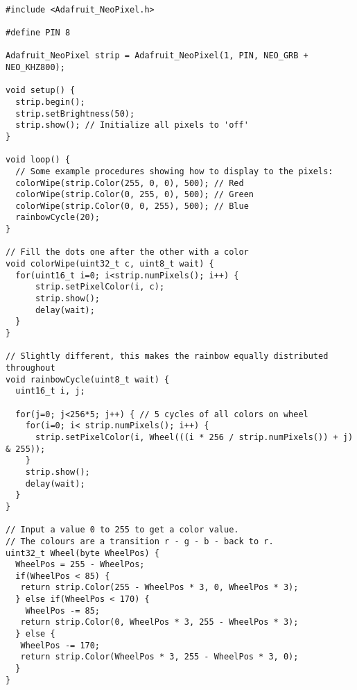 \begin{verbatim}

#include <Adafruit_NeoPixel.h>

#define PIN 8

Adafruit_NeoPixel strip = Adafruit_NeoPixel(1, PIN, NEO_GRB + NEO_KHZ800);

void setup() {
  strip.begin();
  strip.setBrightness(50);
  strip.show(); // Initialize all pixels to 'off'
}

void loop() {
  // Some example procedures showing how to display to the pixels:
  colorWipe(strip.Color(255, 0, 0), 500); // Red
  colorWipe(strip.Color(0, 255, 0), 500); // Green
  colorWipe(strip.Color(0, 0, 255), 500); // Blue
  rainbowCycle(20);
}

// Fill the dots one after the other with a color
void colorWipe(uint32_t c, uint8_t wait) {
  for(uint16_t i=0; i<strip.numPixels(); i++) {
      strip.setPixelColor(i, c);
      strip.show();
      delay(wait);
  }
}

// Slightly different, this makes the rainbow equally distributed throughout
void rainbowCycle(uint8_t wait) {
  uint16_t i, j;

  for(j=0; j<256*5; j++) { // 5 cycles of all colors on wheel
    for(i=0; i< strip.numPixels(); i++) {
      strip.setPixelColor(i, Wheel(((i * 256 / strip.numPixels()) + j) & 255));
    }
    strip.show();
    delay(wait);
  }
}

// Input a value 0 to 255 to get a color value.
// The colours are a transition r - g - b - back to r.
uint32_t Wheel(byte WheelPos) {
  WheelPos = 255 - WheelPos;
  if(WheelPos < 85) {
   return strip.Color(255 - WheelPos * 3, 0, WheelPos * 3);
  } else if(WheelPos < 170) {
    WheelPos -= 85;
   return strip.Color(0, WheelPos * 3, 255 - WheelPos * 3);
  } else {
   WheelPos -= 170;
   return strip.Color(WheelPos * 3, 255 - WheelPos * 3, 0);
  }
}
\end{verbatim}